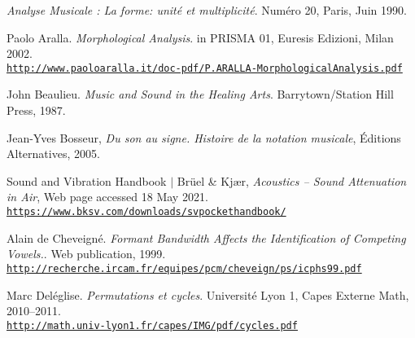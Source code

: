 \renewcommand{\bibname}{References
}

\renewcommand\bibpreamble{$\rightarrow$ The references to go further or deeper for advanced readers are prepended by an asterisk.}

\begin{thebibliography}{99}
\thispagestyle{empty}
		
	\textit{Analyse Musicale : La forme: unité et multiplicité}. Numéro 20, Paris, Juin 1990.
	
	Paolo Aralla. \textit{Morphological Analysis}. in PRISMA 01, Euresis Edizioni, Milan 2002.\\ 
	\href{http://www.paoloaralla.it/doc-pdf/P.ARALLA-MorphologicalAnalysis.pdf}{\scriptsize{\texttt{http://www.paoloaralla.it/doc-pdf/P.ARALLA-MorphologicalAnalysis.pdf}}} \normalsize{}
	
	John Beaulieu. \textit{Music and Sound in the Healing Arts}. Barrytown/Station Hill Press, 1987.
	
	Jean-Yves Bosseur, \textit{Du son au signe. Histoire de la notation musicale}, Éditions Alternatives, 2005.
	
	Sound and Vibration Handbook $|$ Br\"uel \& Kj\ae r, \textit{Acoustics -- Sound Attenuation in Air}, Web page accessed 18 May 2021.\\ 
	\href{https://www.bksv.com/downloads/svpockethandbook/}{\scriptsize{\texttt{https://www.bksv.com/downloads/svpockethandbook/}}} \normalsize{}
		
	Alain de Cheveign\'{e}. \textit{Formant Bandwidth Affects the Identification of Competing Vowels.}. Web publication, 1999.\\ \href{http://recherche.ircam.fr/equipes/pcm/cheveign/ps/icphs99.pdf}{\scriptsize{\texttt{http://recherche.ircam.fr/equipes/pcm/cheveign/ps/icphs99.pdf}}} \normalsize{}

		
	Marc Del\'{e}glise. \textit{Permutations et cycles}. Universit\'{e} Lyon 1, Capes Externe Math, 2010--2011.\\ \href{http://math.univ-lyon1.fr/capes/IMG/pdf/cycles.pdf}{\scriptsize{\texttt{http://math.univ-lyon1.fr/capes/IMG/pdf/cycles.pdf}}} \normalsize{}
	

\end{thebibliography}

